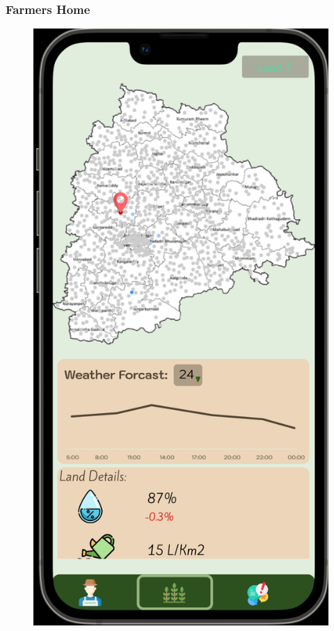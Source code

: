 \subsubsection{Farmers Home}
\begin{figure}[ht]
        \centering
        \includegraphics[width = 0.6\linewidth]{figures/HomeFarmers1.png}
        \label{fig:home}
    \end{figure}
\clearpage

